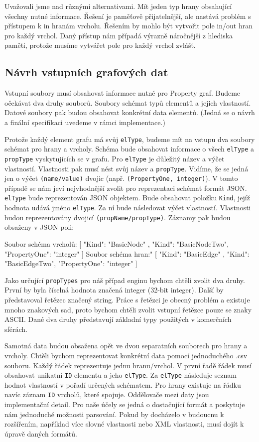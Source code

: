 Uvažovali jsme nad různými alternativami. 
Mít jeden typ hrany obsahující všechny nutné informace.
Řešení je paměťově přijatelnější, ale nastává problém s přístupem k in hranám vrcholu.
Řešením by mohlo být vytvořit pole in/out hran pro každý vrchol. 
Daný přístup nám případá výrazně náročnější z hlediska paměti, protože musíme vytvářet pole pro každý vrchol zvlášť. 

\subsection{Návrh vstupních grafových dat}

Vstupní soubory musí obsahovat informace nutné pro Property graf.
Budeme očekávat dva druhy souborů.
Soubory schémat typů elementů a jejich vlastností.
Datové soubory pak budou obsahovat konkrétní data elementů.
(Jedná se o návrh a finální specifikaci uvedeme v rámci implementace.)

Protože každý element grafu má svůj \verb+elType+, budeme mít na vstupu dva soubory schémat pro hrany a vrcholy.
Schéma bude obsahovat informace o všech \verb+elType+ a \verb+propType+ vyskytujících se v grafu.
Pro \verb+elType+ je důležitý název a výčet vlastností.
Vlastnosti pak musí nést svůj název a \verb+propType+.
Vidíme, že se jedná jen o výčet \verb+(name/value)+ dvojic (např. \verb+(PropertyOne, integer)+).
V tomto případě se nám jeví nejvhodnější zvolit pro reprezentaci schémat formát JSON.
\verb+elType+ bude reprezentován JSON objektem. 
Bude obsahovat položku \verb+Kind+, jejíž hodnota udává jméno \verb+elType+.
Za ní bude následovat výčet vlastností.
Vlastnosti budou reprezentovány dvojicí \verb+(propName/propType)+.
Záznamy pak budou obsaženy v JSON poli:
\begin{code}
Soubor schéma vrcholů:
[    { "Kind": "BasicNode" }, 
     { "Kind": "BasicNodeTwo", "PropertyOne": "integer" } ]
Soubor schéma hran:"
[    { "Kind": "BasicEdge" }, 
     { "Kind": "BasicEdgeTwo", "PropertyOne": "integer" } ]
\end{code}
Jako určující \verb+propTypes+ pro náš případ enginu bychom chtěli zvolit dva druhy.
První by byla číselná hodnota značená integer (32-bit integer).
Další by představoval řetězec značený string.
Práce s řetězci je obecný problém a existuje mnoho znakových sad, proto bychom chtěli zvolit vstupní řetězce pouze se znaky ASCII.  
Dané dva druhy představují základní typy použitých v komerčních sférách.

Samotná data budou obsažena opět ve dvou separatních souborech pro hrany a vrcholy.
Chtěli bychom reprezentovat konkrétní data pomocí jednoduchého .csv souboru.
Každý řádek reprezentuje jednu hranu/vrchol.
V první řadě řádek musí obsahovat unikatní \verb+ID+ elementu a jeho \verb+elType+. 
Za \verb+elType+ následuje seznam hodnot vlastností v pořadí určených schématem.
Pro hrany existuje na řádku navíc záznam \verb+ID+ vrcholů, které spojuje.
Oddělovače mezi daty jsou implementační detail.
Pro naše účely se jedná o dostačující formát a poskytuje nám jednoduché možnosti parsování.
Pokud by docházelo v budoucnu k rozšířením, například více slovné vlastnosti nebo XML vlastnosti, musí dojít k úpravě daných formátů.

